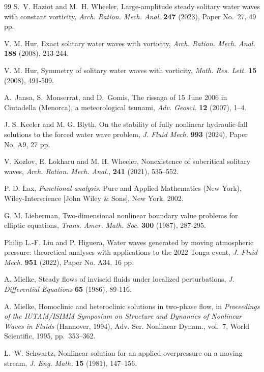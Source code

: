 \documentclass[12pt,letterpaper]{amsart}
\numberwithin{equation}{section}
\begin{document}
\begin{thebibliography}{99}
S.~V. Haziot and M.~H. Wheeler,
Large-amplitude steady solitary water waves with constant vorticity,
\emph{Arch. Ration. Mech. Anal.} \textbf{247} (2023), Paper No.~27, 49 pp.


 V. M.  Hur, Exact solitary water waves with vorticity,
\emph{Arch. Ration. Mech. Anal.} \textbf{188} (2008), 213-244.

     V. M.  Hur, Symmetry of solitary water waves with vorticity,
    \emph{Math. Res. Lett.} \textbf{15} (2008), 491-509.

A.~Jansa, S.~Monserrat, and D.~Gomis,
The rissaga of 15 June 2006 in Ciutadella (Menorca), a meteorological tsunami,
\emph{Adv. Geosci.} \textbf{12} (2007), 1--4.

J. S. Keeler and M. G.  Blyth, On the stability of fully nonlinear hydraulic-fall solutions to the forced water wave problem, \emph{J. Fluid Mech.} \textbf{993} (2024), Paper No. A9, 27 pp.



V. Kozlov, E. Lokharu and M. H. Wheeler, Nonexistence of subcritical solitary waves, \emph{{Arch. Ration. Mech. Anal.}}, \textbf{241}
(2021), {535--552}.

 P. D. Lax, \emph{Functional analysis}. Pure and Applied Mathematics (New York), Wiley-Interscience [John Wiley \& Sons], New York, 2002.



G. M. Lieberman, Two-dimensional nonlinear boundary value problems for elliptic equations, \emph{Trans. Amer. Math. Soc.} \textbf{300} (1987), 287-295.

 Philip L.-F. Liu and P. Higuera, Water waves generated by moving atmospheric pressure: theoretical analyses with applications to the 2022 {Tonga} event, \emph{J. Fluid Mech.} \textbf{951} (2022), Paper No. A34, 16 pp.

 A. Mielke, Steady flows of inviscid fluids under localized perturbations, \emph{J. Differential Equations} \textbf{65} (1986), 89-116.

A. Mielke,
Homoclinic and heteroclinic solutions in two-phase flow,
in \emph{Proceedings of the IUTAM/ISIMM Symposium on Structure
	and Dynamics of Nonlinear Waves in Fluids} (Hannover, 1994),
Adv. Ser. Nonlinear Dynam., vol.~7,
World Scientific, 1995, pp.~353--362.

L.~W. Schwartz,
Nonlinear solution for an applied overpressure on a moving stream,
\emph{J. Eng. Math.} \textbf{15} (1981), 147--156.




\end{thebibliography}
\end{document}
